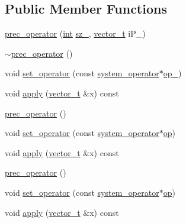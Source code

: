 \subsection*{Public Member Functions}
\begin{DoxyCompactItemize}
\item 
\hyperlink{structprec__operator_a50395140e13578d715b93a48ed620392}{prec\-\_\-operator} (\hyperlink{classint}{int} \hyperlink{structcpu__vector__operations_a2a4bf62b86d243cb5fba381dda5c1e3d}{sz\-\_\-}, \hyperlink{linear__solvers__test_8cpp_a8d0acf9490f363fba134e7c88d751014}{vector\-\_\-t} i\-P\-\_\-)
\item 
\hyperlink{structprec__operator_a49b071af3896a71655fc7f0a8d67ac5d}{$\sim$prec\-\_\-operator} ()
\item 
void \hyperlink{structprec__operator_a133650134415463a904a57fd09bd166e}{set\-\_\-operator} (const \hyperlink{structsystem__operator}{system\-\_\-operator}$\ast$\hyperlink{structprec__operator_aca40061d71943ef2781bcfde64280dcf}{op\-\_\-})
\item 
void \hyperlink{structprec__operator_aa17c44dd36147d1967bdfc526bb424b1}{apply} (\hyperlink{linear__solvers__test_8cpp_a8d0acf9490f363fba134e7c88d751014}{vector\-\_\-t} \&x) const 
\item 
\hyperlink{structprec__operator_a5a318beafb080240406daff0a11b4c20}{prec\-\_\-operator} ()
\item 
void \hyperlink{structprec__operator_a643b2d5f78278bf3595c21ec7e2aa214}{set\-\_\-operator} (const \hyperlink{structsystem__operator}{system\-\_\-operator}$\ast$\hyperlink{structprec__operator_af1130a19572d81a4283cf942defc9e32}{op})
\item 
void \hyperlink{structprec__operator_aa17c44dd36147d1967bdfc526bb424b1}{apply} (\hyperlink{linear__solvers__test_8cpp_a8d0acf9490f363fba134e7c88d751014}{vector\-\_\-t} \&x) const 
\item 
\hyperlink{structprec__operator_a5a318beafb080240406daff0a11b4c20}{prec\-\_\-operator} ()
\item 
void \hyperlink{structprec__operator_a643b2d5f78278bf3595c21ec7e2aa214}{set\-\_\-operator} (const \hyperlink{structsystem__operator}{system\-\_\-operator}$\ast$\hyperlink{structprec__operator_af1130a19572d81a4283cf942defc9e32}{op})
\item 
void \hyperlink{structprec__operator_aa17c44dd36147d1967bdfc526bb424b1}{apply} (\hyperlink{linear__solvers__test_8cpp_a8d0acf9490f363fba134e7c88d751014}{vector\-\_\-t} \&x) const 
\item 

\end{DoxyCompactItemize}
